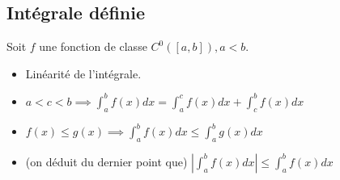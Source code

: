 \documentclass{article}
\begin{document}
\subsection{Intégrale définie}

Soit $ f $ une fonction de classe $ C^0([a, b]), a < b $.

\begin{itemize}
    \item Linéarité de l'intégrale.
    \item $ a < c < b \implies \int_{a}^bf(x)dx = \int_{a}^c f(x)dx + \int_{c}^b f(x)dx$
    \item $ f(x) \leq g(x) \implies \int_{a}^b f(x)dx \leq \int_{a}^b g(x)dx $
    \item (on déduit du dernier point que) $ |\int_{a}^bf(x)dx| \leq \int_{a}^bf(x)dx $ 
\end{itemize}
\end{document}
